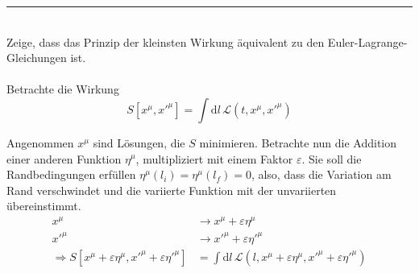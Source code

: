 \documentclass{article}
\newcommand{\diff}{\mathrm{d}}
\begin{document}
{\color{violet}
\hrule
	\\
	Zeige, dass das Prinzip der kleinsten Wirkung äquivalent zu den Euler-Lagrange-Gleichungen ist.\\
	\\
	Betrachte die Wirkung
		$$S[x^\mu,x'^\mu] = \int \diff l\, \mathcal{L}(t,x^\mu,x'^\mu)$$

	Angenommen $x^\mu$ sind Lösungen, die $S$ minimieren. Betrachte nun die Addition einer anderen Funktion $\eta^\mu$, multipliziert mit einem Faktor $\varepsilon$. Sie soll die Randbedingungen erfüllen $\eta^\mu(l_i) = \eta^\mu(l_f) = 0$, also, dass die Variation am Rand verschwindet und die variierte Funktion mit der unvariierten übereinstimmt.
		\begin{align*}
			x^\mu &\to x^\mu + \varepsilon \eta^\mu \\
			x'^\mu &\to x'^\mu + \varepsilon \eta'^\mu \\
			\Rightarrow S[x^\mu + \varepsilon \eta^\mu, x'^\mu + \varepsilon \eta'^\mu] &= \int \diff l\, \mathcal{L}(l, x^\mu + \varepsilon \eta^\mu, x'^\mu + \varepsilon \eta'^\mu)
		\end{align*}
	
}
\end{document}
